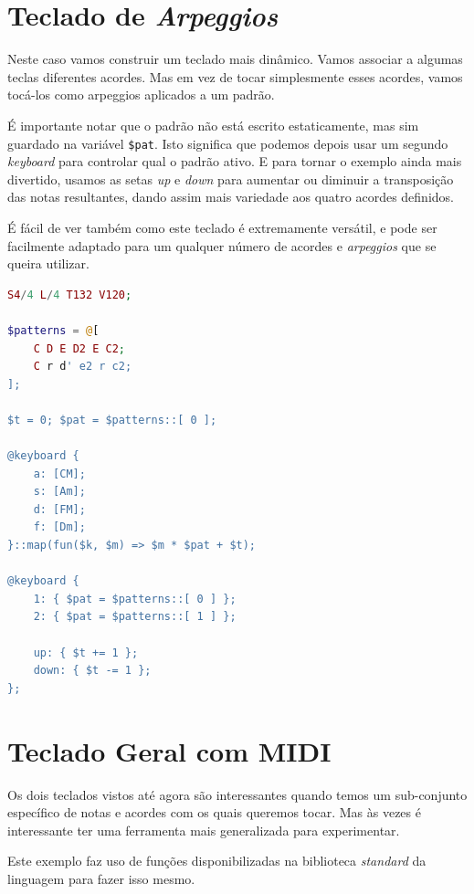 \section{Teclado de \textit{Arpeggios}}
Neste caso vamos construir um teclado mais dinâmico. Vamos associar a algumas teclas diferentes acordes. Mas em vez de tocar simplesmente esses acordes, vamos tocá-los como arpeggios aplicados a um padrão.

É importante notar que o padrão não está escrito estaticamente, mas sim guardado na variável \texttt{\$pat}. Isto significa que podemos depois usar um segundo \textit{keyboard} para controlar qual o padrão ativo. E para tornar o exemplo ainda mais divertido, usamos as setas \textit{up} e \textit{down} para aumentar ou diminuir a transposição das notas resultantes, dando assim mais variedade aos quatro acordes definidos.

É fácil de ver também como este teclado é extremamente versátil, e pode ser facilmente adaptado para um qualquer número de acordes e \textit{arpeggios} que se queira utilizar.

\begin{lstlisting}[caption=Definição de um teclado de acordes,language=PHP]
S4/4 L/4 T132 V120;

$patterns = @[
    C D E D2 E C2;
    C r d' e2 r c2;
];

$t = 0; $pat = $patterns::[ 0 ];

@keyboard {
    a: [CM];
    s: [Am];
    d: [FM];
    f: [Dm];
}::map(fun($k, $m) => $m * $pat + $t);

@keyboard {
    1: { $pat = $patterns::[ 0 ] };
    2: { $pat = $patterns::[ 1 ] };

    up: { $t += 1 };
    down: { $t -= 1 };
};
\end{lstlisting}

\section{Teclado Geral com MIDI}
Os dois teclados vistos até agora são interessantes quando temos um sub-conjunto específico de notas e acordes com os quais queremos tocar. Mas às vezes é interessante ter uma ferramenta mais generalizada para experimentar.

Este exemplo faz uso de funções disponibilizadas na biblioteca \textit{standard} da linguagem para fazer isso mesmo. 

